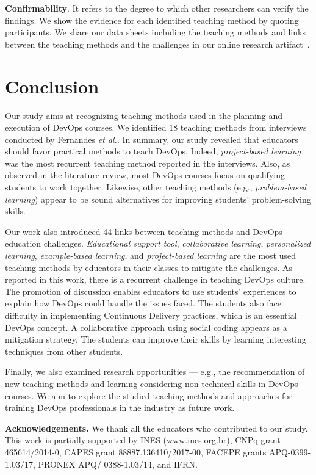 \documentclass[10pt,conference]{IEEEtran}
\begin{document}
{\textbf{Confirmability}.} It refers to the degree to which other researchers can verify the findings. We show the evidence for each identified teaching method by quoting participants. We share our data sheets including the teaching methods and links between the teaching methods and the challenges in our online research artifact~\cite{researchArtifact}.


\section{Conclusion}   \label{sec:conclusion}


Our study aims at recognizing teaching methods used in the planning and execution of DevOps courses. We identified 18 teaching methods from interviews conducted by Fernandes \textit{et al.}\cite{fernandes:2022}. In summary, our study revealed that educators should favor practical methods to teach DevOps. Indeed, \textit{project-based learning} was the most recurrent teaching method reported in the interviews. Also, as observed in the literature review, most DevOps courses focus on qualifying students to work together. Likewise, other teaching methods (e.g., \textit{problem-based learning}) appear to be sound alternatives for improving students' problem-solving skills.


Our work also introduced 44 links between teaching methods and DevOps education challenges. \textsl{Educational support tool}, \textsl{collaborative learning}, \textsl{personalized learning}, \textsl{example-based learning}, and \textsl{project-based learning} are the most used teaching methods by educators in their classes to mitigate the challenges. As reported in this work, there is a recurrent challenge in teaching DevOps culture.  The promotion of discussion enables educators to use students' experiences to explain how DevOps could handle the issues faced.  The students also face difficulty in implementing Continuous Delivery practices, which is an essential DevOps concept. A collaborative approach using social coding appears as a mitigation strategy. The students can improve their skills by learning interesting techniques from other students.

Finally, we also examined research opportunities — e.g., the recommendation of new teaching methods and learning considering non-technical skills in DevOps courses. We aim to explore the studied teaching methods and approaches for training DevOps professionals in the industry as future work.


\vspace{0.4cm}

\textbf{Acknowledgements.} We thank all the educators who contributed to our study. This work is partially supported by INES (www.ines.org.br), CNPq grant 465614/2014-0, CAPES grant 88887.136410/2017-00, FACEPE grants APQ-0399-1.03/17, PRONEX APQ/ 0388-1.03/14, and IFRN.



\end{document}
